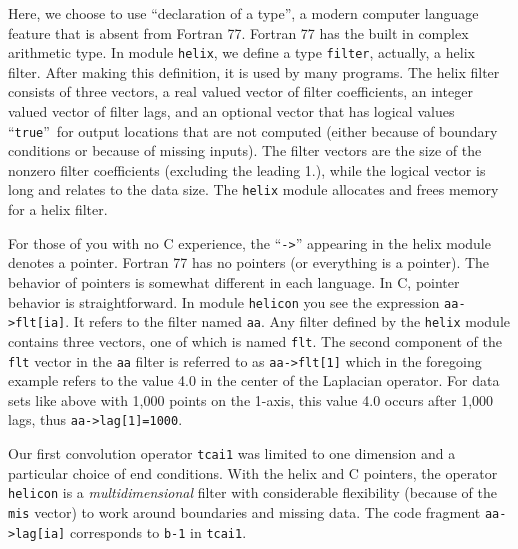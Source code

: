 \par
Here, we choose to use
``declaration of a type'',
a modern computer language feature that is absent from Fortran 77.
Fortran 77 has the built in complex arithmetic type.
In module \texttt{helix},
we define a type \texttt{filter}, actually, a helix filter.
After making this definition, it is used by many programs.
The helix filter consists of three vectors,
a real valued vector of filter coefficients,
an integer valued vector of filter lags,
and an optional vector
that has logical values ``\texttt{true}''~for
output locations that are not computed
(either because of boundary conditions or because of missing inputs).
The filter vectors are the size of the nonzero filter coefficients
(excluding the leading 1.), while the logical vector is long
and relates to the data size.
The \texttt{helix} module allocates and frees memory for a helix filter.
\par
For those of you with no C  experience,
the ``\verb#->#'' appearing in the helix module denotes a pointer.
Fortran 77 has no pointers (or everything is a pointer).
The behavior of pointers is somewhat different in each language.
In C, pointer behavior is straightforward.
In module \texttt{helicon} %
you see the expression
\verb#aa->flt[ia]#.
It refers to the filter named \texttt{aa}.
Any filter defined by the \texttt{helix} module
contains three vectors, one of which is named \texttt{flt}.
The second component of the \texttt{flt} vector
in the \texttt{aa} filter
is referred to as
\verb#aa->flt[1]# which
in the foregoing example refers to the value 4.0
in the center of the Laplacian operator.
For data sets like above with 1,000 points on the 1-axis,
this value 4.0 occurs after 1,000 lags,
thus \verb#aa->lag[1]=1000#.

\par
Our first convolution operator
\texttt{tcai1}
was limited to one dimension and a particular choice of end conditions.
With the helix and C pointers,
the operator
\texttt{helicon} %
is a {\it multidimensional} filter
with considerable flexibility (because of the \texttt{mis} vector)
to work around boundaries and missing data.
The code fragment
\verb#aa->lag[ia]#
corresponds to 
\texttt{b-1}
in \texttt{tcai1}.


